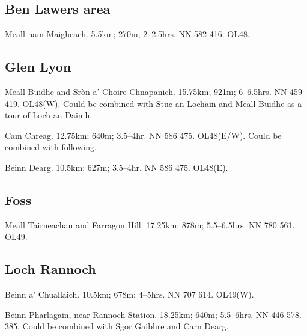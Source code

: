 
\subsection{Ben Lawers area}

\begin{munros}
\item
Meall nam Maigheach.  5.5km; 270m; 2--2.5hrs.  NN 582 416.  OL48.
\end{munros}


\subsection{Glen Lyon}

\begin{munros}
\item
Meall Buidhe and Sròn a' Choire Chnapanich.  15.75km; 921m; 6--6.5hrs.
NN 459 419.  OL48(W).  Could be combined with Stuc an Lochain and Meall Buidhe as
a tour of Loch an Daimh.

\item
Cam Chreag.  12.75km; 640m; 3.5--4hr.  NN 586 475.  OL48(E/W).  Could be combined
with following. 

\item
Beinn Dearg.  10.5km; 627m; 3.5--4hr. NN 586 475.  OL48(E). 
\end{munros}

\subsection{Foss}

\begin{munros}
\item
Meall Tairneachan and Farragon Hill.  17.25km; 878m; 5.5--6.5hrs.  NN 780 561.
OL49.
\end{munros}


\subsection{Loch Rannoch}

\begin{munros}
\item
Beinn a' Chuallaich.  10.5km; 678m; 4--5hrs.  NN 707 614.  OL49(W). 

\item\target
Beinn Pharlagain, near Rannoch Station.  18.25km; 640m; 5.5--6hrs.  NN 446
578.  385.  Could be combined with Sgor Gaibhre and Carn Dearg.  
\end{munros}
